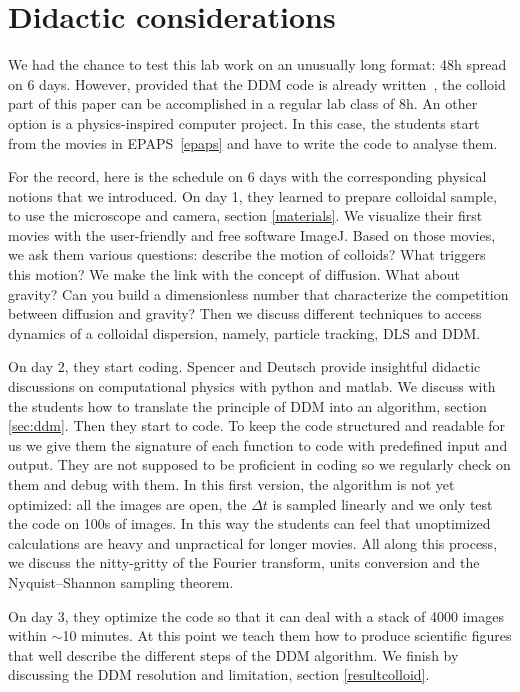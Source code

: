 \documentclass[prb,reprint,amsmath,amssymb]{revtex4-1}
\newcommand{\tg}[1]{{\color{magenta}#1}} %
\begin{document}
\section{\label{didac}Didactic considerations}
\tg{We had the chance to test this lab work on an unusually long format: 48h spread on 6 days. However, provided that the DDM code is already written~\cite{code_github}, the colloid part of this paper can be accomplished in a regular lab class of 8h. An other option is a physics-inspired computer project. In this case, the students start from the movies in EPAPS~\ref{epaps} and have to write the code to analyse them.}

For the record, here is the schedule on 6 days with the corresponding physical notions that we introduced. On day 1, they learned to prepare colloidal sample, to use the microscope and camera, section \ref{materials}. We visualize their first movies with the user-friendly and free software  ImageJ. Based on those movies, we ask them various questions: describe the motion of colloids? What triggers this motion? We make the link with the concept of diffusion. What about gravity? Can you build a dimensionless number that characterize the competition between diffusion and gravity? Then we discuss different techniques to access dynamics of a colloidal dispersion, namely, particle tracking, DLS and DDM.

On day 2, they start coding. Spencer and Deutsch provide insightful didactic discussions on computational physics with python\cite{ajp2014deutsh} and matlab\cite{ajp2005spencer}. We discuss with the students how to translate the principle of DDM into an algorithm, section \ref{sec:ddm}. Then they start to code. To keep the code structured and readable for us we give them the signature of each function to code with predefined input and output. They are not supposed to be proficient in coding so we regularly check on them and debug with them. In this first version, the algorithm is not yet optimized: all the images are open, the $\Delta t$ is sampled linearly and we only test the code on 100s of images. In this way the students can feel that unoptimized  calculations are heavy and unpractical for longer movies. All along this process, we discuss the nitty-gritty of the Fourier transform, units conversion and the Nyquist–Shannon sampling theorem.

On day 3, they optimize the code so that it can deal with a stack of 4000 images within $\sim$10 minutes. At this point we teach them how to produce scientific figures that well describe the different steps of the DDM algorithm. We finish by discussing the DDM resolution and limitation, section \ref{resultcolloid}.
\end{document}
